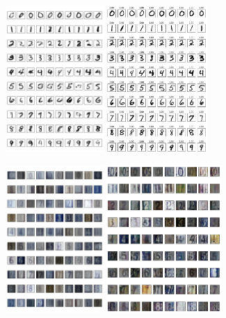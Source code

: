 \documentclass[portrait,fontscale=0.40,paperwidth=30in, paperheight=40in,margin=1in]{baposter} %
\theoremstyle{definition}
\theoremstyle{remark}
\begin{document}
\begin{poster}
{\begin{minipage}[b]{\textwidth}
\includegraphics[height=2.2in]{images/by_label.png}
\includegraphics[height=2.2in]{images/cvaegan_images1.png}
\centering
\end{minipage}

\begin{minipage}[b]{\textwidth}
\center
\includegraphics[height=2.2in]{images/svhn_cvae_fc_label_gen.png}
\includegraphics[height=2.2in]{images/cvaegan_images2.png}
\centering
\end{minipage}
}


\end{poster}
\end{document}
